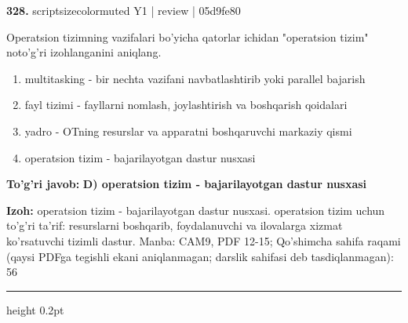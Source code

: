 \documentclass[10pt,a4paper]{article}
\begin{document}
{\bfseries\sffamily\color{ink} 328.} {scriptsizecolor{muted} Y1 | review | 05d9fe80}
\par
Operatsion tizimning vazifalari bo'yicha qatorlar ichidan "operatsion tizim" noto'g'ri izohlanganini aniqlang.
\begin{enumerate}[label=\Alph*),leftmargin=9mm]
\item multitasking - bir nechta vazifani navbatlashtirib yoki parallel bajarish
\item fayl tizimi - fayllarni nomlash, joylashtirish va boshqarish qoidalari
\item yadro - OTning resurslar va apparatni boshqaruvchi markaziy qismi
\item operatsion tizim - bajarilayotgan dastur nusxasi
\end{enumerate}
\begin{tcolorbox}[enhanced,breakable,colback=teal!4,colframe=teal!60!black,boxrule=0.45pt,arc=1.2mm,left=2.7mm,right=2.7mm,top=1.8mm,bottom=1.8mm,before skip=2mm,after skip=2mm]
{\bfseries\sffamily\color{teal}To'g'ri javob:} \textbf{D) operatsion tizim - bajarilayotgan dastur nusxasi}
\par\smallskip
{\bfseries Izoh:} operatsion tizim - bajarilayotgan dastur nusxasi. operatsion tizim uchun to'g'ri ta'rif: resurslarni boshqarib, foydalanuvchi va ilovalarga xizmat ko'rsatuvchi tizimli dastur. Manba: CAM9, PDF 12-15; Qo'shimcha sahifa raqami (qaysi PDFga tegishli ekani aniqlanmagan; darslik sahifasi deb tasdiqlanmagan): 56
\end{tcolorbox}
\vspace{2mm}\hrule height 0.2pt\vspace{3mm}
\end{document}
